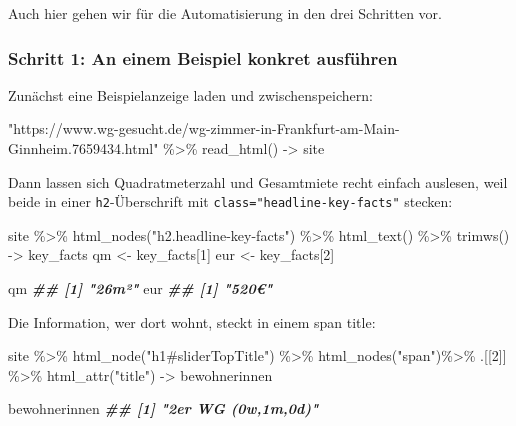 \documentclass[
  ngerman,
]{article}
\newenvironment{Shaded}{\begin{snugshade}}{\end{snugshade}}
\newcommand{\DecValTok}[1]{\textcolor[rgb]{0.00,0.00,0.81}{#1}}
\newcommand{\DocumentationTok}[1]{\textcolor[rgb]{0.56,0.35,0.01}{\textbf{\textit{#1}}}}
\newcommand{\FunctionTok}[1]{\textcolor[rgb]{0.00,0.00,0.00}{#1}}
\newcommand{\NormalTok}[1]{#1}
\newcommand{\OtherTok}[1]{\textcolor[rgb]{0.56,0.35,0.01}{#1}}
\newcommand{\SpecialCharTok}[1]{\textcolor[rgb]{0.00,0.00,0.00}{#1}}
\newcommand{\StringTok}[1]{\textcolor[rgb]{0.31,0.60,0.02}{#1}}
\begin{document}
Auch hier gehen wir für die Automatisierung in den drei Schritten vor.

\hypertarget{schritt-1-an-einem-beispiel-konkret-ausfuxfchren-1}{%
\subsubsection{Schritt 1: An einem Beispiel konkret ausführen}\label{schritt-1-an-einem-beispiel-konkret-ausfuxfchren-1}}

Zunächst eine Beispielanzeige laden und zwischenspeichern:

\begin{Shaded}
\begin{Highlighting}[]
\StringTok{"https://www.wg{-}gesucht.de/wg{-}zimmer{-}in{-}Frankfurt{-}am{-}Main{-}Ginnheim.7659434.html"} \SpecialCharTok{\%\textgreater{}\%}
  \FunctionTok{read\_html}\NormalTok{() }\OtherTok{{-}\textgreater{}}\NormalTok{ site}
\end{Highlighting}
\end{Shaded}

Dann lassen sich Quadratmeterzahl und Gesamtmiete recht einfach auslesen, weil beide in einer \texttt{h2}-Überschrift mit \texttt{class="headline-key-facts"} stecken:

\begin{Shaded}
\begin{Highlighting}[]
\NormalTok{site }\SpecialCharTok{\%\textgreater{}\%}
  \FunctionTok{html\_nodes}\NormalTok{(}\StringTok{"h2.headline{-}key{-}facts"}\NormalTok{) }\SpecialCharTok{\%\textgreater{}\%}
  \FunctionTok{html\_text}\NormalTok{() }\SpecialCharTok{\%\textgreater{}\%}
  \FunctionTok{trimws}\NormalTok{() }\OtherTok{{-}\textgreater{}}\NormalTok{ key\_facts}
\NormalTok{  qm }\OtherTok{\textless{}{-}}\NormalTok{ key\_facts[}\DecValTok{1}\NormalTok{]}
\NormalTok{  eur }\OtherTok{\textless{}{-}}\NormalTok{ key\_facts[}\DecValTok{2}\NormalTok{]}

\NormalTok{qm}
\DocumentationTok{\#\# [1] "26m²"}
\NormalTok{eur}
\DocumentationTok{\#\# [1] "520€"}
\end{Highlighting}
\end{Shaded}

Die Information, wer dort wohnt, steckt in einem span title:

\begin{Shaded}
\begin{Highlighting}[]
\NormalTok{site }\SpecialCharTok{\%\textgreater{}\%}
  \FunctionTok{html\_node}\NormalTok{(}\StringTok{"h1\#sliderTopTitle"}\NormalTok{) }\SpecialCharTok{\%\textgreater{}\%}
  \FunctionTok{html\_nodes}\NormalTok{(}\StringTok{"span"}\NormalTok{)}\SpecialCharTok{\%\textgreater{}\%}
\NormalTok{  .[[}\DecValTok{2}\NormalTok{]] }\SpecialCharTok{\%\textgreater{}\%}
  \FunctionTok{html\_attr}\NormalTok{(}\StringTok{"title"}\NormalTok{) }\OtherTok{{-}\textgreater{}}\NormalTok{ bewohnerinnen}

\NormalTok{bewohnerinnen}
\DocumentationTok{\#\# [1] "2er WG (0w,1m,0d)"}
\end{Highlighting}
\end{Shaded}
\end{document}
